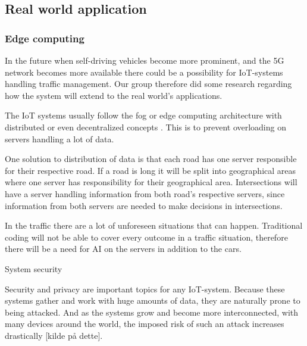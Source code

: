 \subsection{Real world application}
\subsubsection*{Edge computing}
In the future when self-driving vehicles become more prominent, and the 5G network becomes more available there could be a possibility for IoT-systems handling traffic management. Our group therefore did some research regarding how the system will extend to the real world’s applications. 

The IoT systems usually follow the fog or edge computing architecture with distributed or even decentralized concepts \parencite[pp 149]{iot_platforms}. This is to prevent overloading on servers handling a lot of data. 

One solution to distribution of data is that each road has one server responsible for their respective road. If a road is long it will be split into geographical areas where one server has responsibility for their geographical area. Intersections will have a server handling information from both road’s respective servers, since information from both servers are needed to make decisions in intersections.

In the traffic there are a lot of unforeseen situations that can happen. Traditional coding will not be able to cover every outcome in a traffic situation, therefore there will be a need for AI on the servers in addition to the cars. 

System security

Security and privacy are important topics for any IoT-system. Because these systems gather and work with huge amounts of data, they are naturally prone to being attacked. And as the systems grow and become more interconnected, with many devices around the world, the imposed risk of such an attack increases drastically [kilde på dette].

